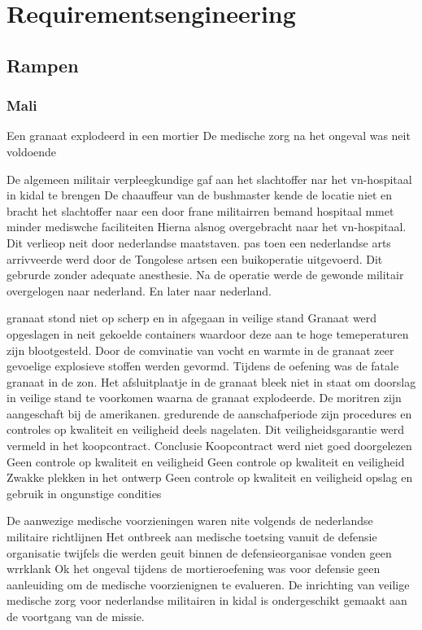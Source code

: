 \newpage
\section{Requirementsengineering}

\subsection{Rampen}
 

\subsubsection{Mali}
Een granaat explodeerd in een mortier
De medische zorg na het ongeval was neit voldoende


De algemeen militair verpleegkundige gaf aan het slachtoffer nar het vn-hospitaal in kidal te brengen
De chaauffeur van de bushmaster kende de locatie niet  en bracht het slachtoffer naar een door frane militairren bemand hospitaal mmet minder mediswche faciliteiten
Hierna alsnog overgebracht naar het vn-hospitaal.
Dit verlieop  neit door nederlandse maatstaven.
pas toen een nederlandse arts arrivveerde werd door de Tongolese artsen een buikoperatie uitgevoerd.
Dit gebrurde zonder adequate anesthesie.
Na de operatie werde de gewonde militair overgelogen naar nederland. En later naar nederland.


granaat stond niet op scherp en in afgegaan in veilige stand
Granaat werd opgeslagen in neit gekoelde containers waardoor deze aan te hoge temeperaturen zijn blootgesteld.
Door de comvinatie van vocht en warmte in de granaat zeer gevoelige explosieve stoffen werden gevormd.
Tijdens de oefening was de fatale granaat in de zon.
Het afsluitplaatje in de granaat bleek niet in staat om doorslag in veilige stand te voorkomen waarna de granaat explodeerde.
De moritren zijn aangeschaft bij de amerikanen. gredurende de aanschafperiode zijn procedures en controles op kwaliteit en veiligheid deels nagelaten.
Dit veiligheidsgarantie werd vermeld in het koopcontract.
Conclusie
Koopcontract werd niet goed doorgelezen
Geen controle op kwaliteit en veiligheid
Geen controle op kwaliteit en veiligheid
Zwakke plekken in het ontwerp
Geen controle op kwaliteit en veiligheid
opslag en gebruik in ongunstige condities

De aanwezige medische voorzieningen waren nite volgends de nederlandse militaire richtlijnen
Het ontbreek aan medische toetsing vanuit de defensie organisatie
twijfels die werden geuit binnen de defensieorganisae vonden geen wrrklank
Ok het ongeval tijdens de mortieroefening was voor defensie geen aanleuiding om de medische voorzienignen te evalueren.
De inrichting van veilige medische zorg voor nederlandse militairen in kidal is ondergeschikt gemaakt aan de voortgang van de missie.


